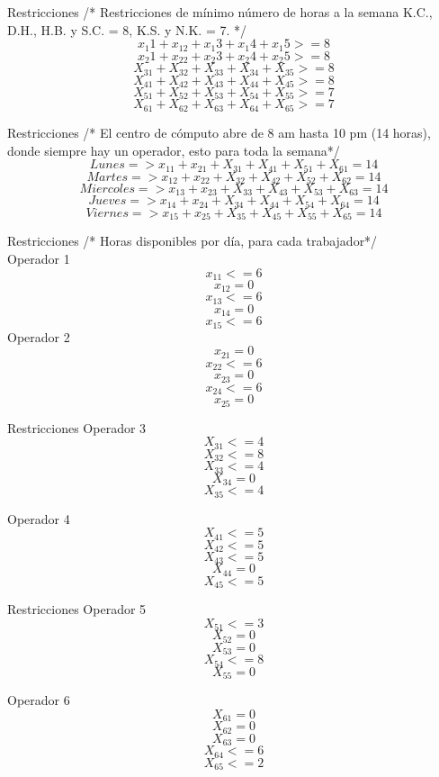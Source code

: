 \documentclass{beamer}
\begin{document}
\begin{frame}[fragile]{Restricciones}
/* Restricciones  de mínimo número de horas a la semana K.C., D.H., H.B. y S.C. = 8, K.S. y N.K. = 7. */\\
\[x_{1}1 + x_{12} +x_{1}3+x_{1}4 +x_{1}5 >=8\]
\[x_{2}1 + x_{22} +x_{2}3+x_{2}4 + x_{2}5 >= 8\]
\[X_{31} + X_{32} +X_{33}+X_{34} +X_{35} >= 8\]
\[X_{41} + X_{42} +X_{43}+X_{44} +X_{45} >= 8\]
\[X_{51} + X_{52} +X_{53}+X_{54} +X_{55} >= 7\]
\[X_{61} + X_{62} +X_{63}+X_{64} +X_{65} >= 7\]
\end{frame}
\begin{frame}[fragile]{Restricciones}
/* El centro de cómputo abre de 8 am hasta 10 pm  (14 horas), donde siempre hay un operador, esto para toda la semana*/\\
\[Lunes => x_{11} + x_{21} + X_{31} +X_{41} + X_{51} +X_{61} = 14  \]
\[Martes=> x_{12} + x_{22} + X_{32} +X_{42} + X_{52} + X_{62} = 14\]
\[Miercoles=> x_{13} + x_{23} + X_{33} +X_{43} + X_{53} +X_{63} = 14\]
\[Jueves => x_{14} + x_{24} + X_{34} +X_{44} + X_{54} +X_{64} = 14\]
\[Viernes => x_{15} + x_{25} + X_{35} +X_{45} + X_{55} +X_{65} = 14  \]

\end{frame}
\begin{frame}[fragile]{Restricciones}
/* Horas disponibles por día, para cada trabajador*/\\
Operador 1\\
    \[x_{11} <= 6\]
    \[x_{12} = 0\]
    \[x_{13} <= 6\]
    \[x_{14}  = 0\]
    \[x_{15} <= 6\]
Operador 2\\
    \[x_{21} = 0 \]
    \[x_{22} <= 6\]
    \[x_{23} = 0\]
    \[x_{24}  <= 6\]
    \[x_{25} = 0\]
\end{frame}
\begin{frame}[fragile]{Restricciones}
Operador 3\\
    \[X_{31} <= 4 \]
    \[X_{32} <= 8\]
    \[X_{33} <= 4\]
    \[X_{34}  = 0\]
    \[X_{35} <= 4\]


Operador 4\\
    \[X_{41} <= 5\]
    \[X_{42} <= 5\]
    \[X_{43} <= 5\]
    \[X_{44}  = 0\]
    \[X_{45} <= 5\]
\end{frame}
\begin{frame}[fragile]{Restricciones}
Operador 5\\
    \[X_{51} <= 3\]
    \[X_{52} = 0\]
    \[X_{53} = 0\]
    \[X_{54}  <=  8\]
    \[X_{55} = 0\]

Operador 6\\
    \[X_{61} = 0 \]
    \[X_{62} = 0\]
    \[X_{63} = 0\]
    \[X_{64}  <=  6\]
    \[X_{65} <= 2\]

\end{frame}
\end{document}
